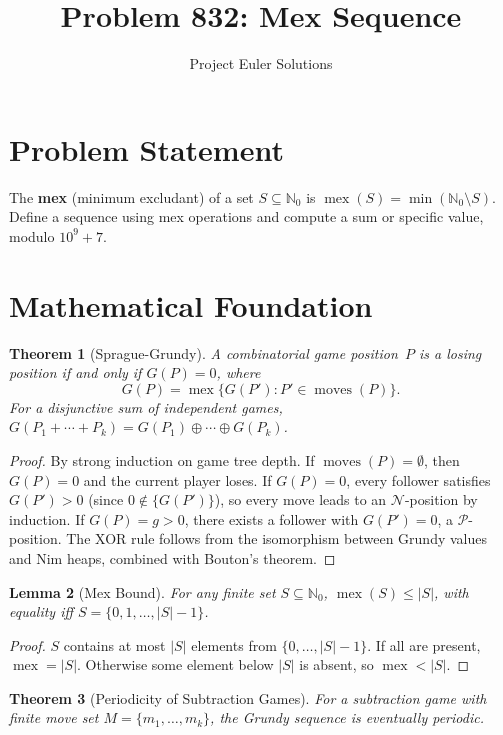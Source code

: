 \documentclass[11pt]{article}
\title{Problem 832: Mex Sequence}
\author{Project Euler Solutions}
\date{}
\newtheorem{theorem}{Theorem}
\newtheorem{lemma}[theorem]{Lemma}
\begin{document}
\maketitle

\section{Problem Statement}

The \textbf{mex} (minimum excludant) of a set $S \subseteq \mathbb{N}_0$ is $\operatorname{mex}(S) = \min(\mathbb{N}_0 \setminus S)$. Define a sequence using mex operations and compute a sum or specific value, modulo $10^9+7$.

\section{Mathematical Foundation}

\begin{theorem}[Sprague-Grundy]
A combinatorial game position~$P$ is a losing position if and only if $G(P)=0$, where
\[
G(P) = \operatorname{mex}\{G(P') : P' \in \operatorname{moves}(P)\}.
\]
For a disjunctive sum of independent games, $G(P_1+\cdots+P_k) = G(P_1)\oplus\cdots\oplus G(P_k)$.
\end{theorem}

\begin{proof}
By strong induction on game tree depth. If $\operatorname{moves}(P)=\emptyset$, then $G(P)=0$ and the current player loses. If $G(P)=0$, every follower satisfies $G(P')>0$ (since $0\notin\{G(P')\}$), so every move leads to an $\mathcal{N}$-position by induction. If $G(P)=g>0$, there exists a follower with $G(P')=0$, a $\mathcal{P}$-position. The XOR rule follows from the isomorphism between Grundy values and Nim heaps, combined with Bouton's theorem.
\end{proof}

\begin{lemma}[Mex Bound]
For any finite set $S\subseteq\mathbb{N}_0$, $\operatorname{mex}(S)\le|S|$, with equality iff $S=\{0,1,\ldots,|S|-1\}$.
\end{lemma}

\begin{proof}
$S$ contains at most $|S|$ elements from $\{0,\ldots,|S|-1\}$. If all are present, $\operatorname{mex}=|S|$. Otherwise some element below $|S|$ is absent, so $\operatorname{mex}<|S|$.
\end{proof}

\begin{theorem}[Periodicity of Subtraction Games]
For a subtraction game with finite move set $M=\{m_1,\ldots,m_k\}$, the Grundy sequence is eventually periodic.
\end{theorem}
\end{document}
